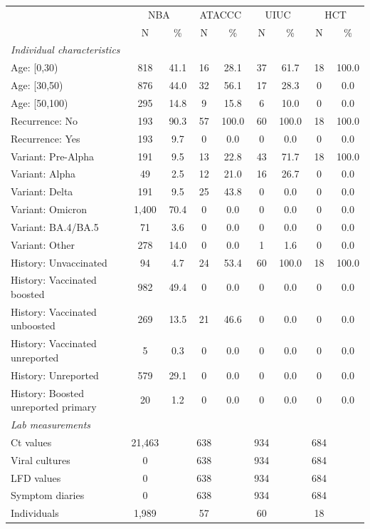 \documentclass[12pt]{article}
\begin{document}
\begin{table}[p]
    \centering
    \small
    \begin{tabular}{lcccccccc}
     \toprule
     & \multicolumn{2}{c}{NBA} & \multicolumn{2}{c}{ATACCC} & \multicolumn{2}{c}{UIUC}  & \multicolumn{2}{c}{HCT} \\
      & N & \%& N & \% & N & \% & N & \% \\
     \midrule
     \textit{Individual characteristics} &  &  &  &  &  &  &  &  \\
     Age: [0,30) & 818 & 41.1 & 16 & 28.1 & 37 & 61.7 & 18 & 100.0 \\
     Age: [30,50) & 876 & 44.0 & 32 & 56.1 & 17 & 28.3 & 0 & 0.0 \\
     Age: [50,100) & 295 & 14.8 & 9 & 15.8 & 6 & 10.0 & 0 & 0.0 \\
     Recurrence: No & 193 & 90.3 & 57 & 100.0 & 60 & 100.0 & 18 & 100.0 \\
     Recurrence: Yes & 193 & 9.7 & 0 & 0.0 & 0 & 0.0 & 0 & 0.0 \\
     Variant: Pre-Alpha & 191 & 9.5 & 13 & 22.8 & 43 & 71.7 & 18 & 100.0 \\
     Variant: Alpha & 49 & 2.5 & 12 & 21.0 & 16 & 26.7 & 0 & 0.0 \\
     Variant: Delta & 191 & 9.5 & 25 & 43.8 & 0 & 0.0 & 0 & 0.0 \\
     Variant: Omicron & 1,400 & 70.4 & 0 & 0.0 & 0 & 0.0 & 0 & 0.0 \\
     Variant: BA.4/BA.5 & 71 & 3.6 & 0 & 0.0 & 0 & 0.0 & 0 & 0.0 \\
     Variant: Other & 278 & 14.0 & 0 & 0.0 & 1 & 1.6 & 0 & 0.0\\
     History: Unvaccinated & 94 & 4.7 & 24 & 53.4 & 60 & 100.0 & 18 & 100.0 \\
     History: Vaccinated boosted & 982 & 49.4 & 0 & 0.0 & 0 & 0.0 & 0 & 0.0 \\
     History: Vaccinated unboosted & 269 & 13.5 & 21 & 46.6 & 0 & 0.0 & 0 & 0.0\\
     History: Vaccinated unreported & 5 & 0.3 & 0 & 0.0 & 0 & 0.0 & 0 & 0.0\\
     History: Unreported & 579 & 29.1 & 0 & 0.0 & 0 & 0.0 & 0 & 0.0\\
     History: Boosted unreported primary & 20 & 1.2 & 0 &0.0 & 0 & 0.0 & 0 & 0.0\\
     \midrule
     \textit{Lab measurements} &  &  &  &  &  &  &  &  \\
        Ct values & 21,463 & & 638 & & 934 & & 684 \\
        Viral cultures & 0 & & 638 & & 934 & & 684 \\
        LFD values & 0 & & 638 & & 934 & & 684 \\
        Symptom diaries & 0 & & 638 & & 934 & & 684 \\
     \midrule
     Individuals & 1,989 &  & 57 & & 60 & & 18 \\
     \bottomrule
     \end{tabular}
    \label{tab:my_label}
\end{table}
\end{document}
